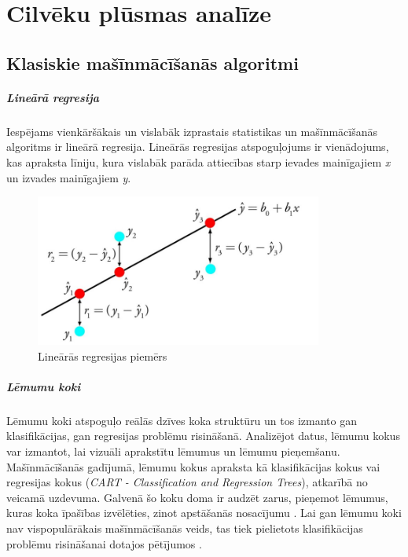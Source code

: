 \chapter{Cilvēku plūsmas analīze}
\section{Klasiskie mašīnmācīšanās algoritmi}
\paragraph{Lineārā regresija}
\hfill\par
Iespējams vienkāršākais un vislabāk izprastais statistikas un mašīnmācīšanās algoritms ir lineārā regresija. Lineārās regresijas atspoguļojums ir vienādojums, kas apraksta līniju, kura vislabāk parāda attiecības starp ievades mainīgajiem \textit{x} un izvades mainīgajiem \textit{y}. 
\begin{figure}[h]%
	\centering
	\includegraphics[height=5cm]{images/linreg.png} %
	\caption{Lineārās regresijas piemērs}%
	\label{fig:example}%
\end{figure}
\paragraph{Lēmumu koki}
\hfill\par
Lēmumu koki atspoguļo reālās dzīves koka struktūru un tos izmanto gan klasifikācijas, gan regresijas problēmu risināšanā. Analizējot datus, lēmumu kokus var izmantot, lai vizuāli aprakstītu lēmumus un lēmumu pieņemšanu. Mašīnmācīšanās gadījumā, lēmumu kokus apraksta kā klasifikācijas kokus vai regresijas kokus (\textit{CART - Classification and Regression Trees}), atkarībā no veicamā uzdevuma.  Galvenā šo koku doma ir audzēt zarus, pieņemot lēmumus, kuras koka īpašības izvēlēties, zinot apstāšanās nosacījumu \cite{dectree}. Lai gan lēmumu koki nav vispopulārākais mašīnmācīšanās veids, tas tiek pielietots klasifikācijas problēmu risināšanai dotajos pētījumos \cite{dectreepaper,pal2003assessment}.

